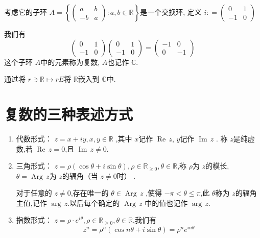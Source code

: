 \documentclass[../../复变函数.tex]{subfiles}
\begin{document}
考虑它的子环 \(  A =  \left\{ \begin{pmatrix} 
    a &b\\ 
     -b&a 
\end{pmatrix}: a,b \in \mathbb{R}   \right\}  \)是一个交换环,   
定义 \(   i: =  \begin{pmatrix} 
    0& 1 \\ 
-1& 0 
\end{pmatrix}  \) 

我们有 \[
\begin{pmatrix} 
    0&1\\ 
     -1&0 
\end{pmatrix} \begin{pmatrix} 
    0&1\\ 
     -1&0 
\end{pmatrix}  =  \begin{pmatrix} 
    -1 &0\\ 
     0&-1 
\end{pmatrix} 
\]这个子环 \(  A  \)中的元素称为复数, \(  A  \)也记作 \(  \mathbb{C}   \).   

通过将 \(  r \ni \mathbb{R} \mapsto r E  \)将 \(  \mathbb{R}   \)嵌入到 \(  \mathbb{C}   \)中.

\section{复数的三种表述方式}

\begin{enumerate}
    \item 代数形式： \(  z =  x+ iy, x,y \in \mathbb{R}   \) ,其中 \(  x   \)记作 \(  \operatorname{Re}\,z  \), \(  y  \)记作 \(  \operatorname{Im}\,z  \)    .
    称 \(  z   \)是纯虚数,若 \(  \operatorname{Re}\,z = 0  \),且 \(  \operatorname{Im}\,z \neq 0  \).   
    \item 三角形式：  \(  z =  \rho \left( \cos  \theta + i\sin  \theta  \right)   , \rho \in \mathbb{R} _{\ge 0},  \theta  \in \mathbb{R} \),称 \(  \rho   \)为 \(  z  \)的模长, \(   \theta  = \operatorname{Arg}\,z  \)为 \(  z  \)的辐角（当 \(  z \neq 0  \)时） . 
     
     对于任意的 \(  z \neq 0  \),存在唯一的 \(   \theta  \in \operatorname{Arg}\,z  \)  ,使得 \(  -\pi < \theta \le \pi   \),此 \(   \theta   \)称为 \(  z  \)的辐角主值,记作 \(  \operatorname{arg}\,z  \).以后每个确定的 \(  \operatorname{Arg}\,z  \)     中的值也记作 \(  \operatorname{arg}\,z  \). 

     \item 指数形式： \(  z =  \rho \cdot e^{i \theta }, \rho  \in \mathbb{R} _{\ge 0}, \theta  \in \mathbb{R}   \),我们有 \[
     z^{n} =  \rho ^{n} \left( \cos n \theta + i\sin  \theta  \right)=  \rho ^{n}e^{in  \theta } 
     \] 
\end{enumerate}
\end{document}
